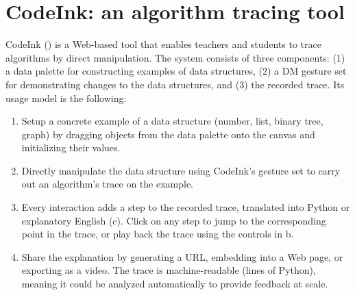 

\section{CodeInk: an algorithm tracing tool}
CodeInk () is a Web-based tool that enables teachers and
students to trace algorithms by direct manipulation. The system consists of
three components: (1) a data palette for constructing examples of data
structures, (2) a DM gesture set for demonstrating changes to the data
structures, and (3) the recorded trace.
Its usage model is the following:

\begin{enumerate}

\item Setup a concrete example of a data structure (number, list, binary tree,
graph) by dragging objects from the data palette onto the canvas and
initializing their values.

\item Directly manipulate the data structure using CodeInk's gesture set to
carry out an algorithm's trace on the example.

\item Every interaction adds a step to the recorded trace, translated into
Python or explanatory English (c). Click on any step to
jump to the corresponding point in the trace, or play back the trace using the
controls in b.

\item Share the explanation by generating a URL, embedding into a Web page, or
exporting as a video. The trace is machine-readable (lines of Python), meaning
it could be analyzed automatically to provide feedback at scale.

\end{enumerate}

